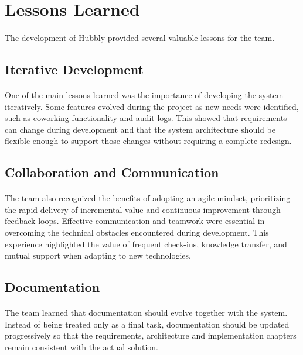 \section{Lessons Learned}

\paragraph{}The development of Hubbly provided several valuable lessons for the team.

\subsection{Iterative Development}

\paragraph{}One of the main lessons learned was the importance of developing the system iteratively. Some features evolved during the project as new needs were identified, such as coworking functionality and audit logs. This showed that requirements can change during development and that the system architecture should be flexible enough to support those changes without requiring a complete redesign.

\subsection{Collaboration and Communication}

\paragraph{}The team also recognized the benefits of adopting an agile mindset, prioritizing the rapid delivery of incremental value and continuous improvement through feedback loops.
Effective communication and teamwork were essential in overcoming the technical obstacles encountered during development. This experience highlighted the value of frequent check-ins, knowledge transfer, and mutual support when adapting to new technologies.

\subsection{Documentation}
\paragraph{}The team learned that documentation should evolve together with the system. Instead of being treated only as a final task, documentation should be updated progressively so that the requirements, architecture and implementation chapters remain consistent with the actual solution.
